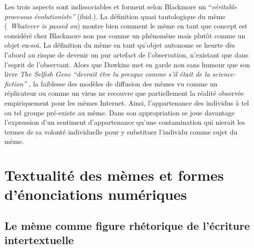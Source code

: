 Les trois aspects sont indissociables et forment selon Blackmore un {\textquotedblleft}\textit{v\'eritable processus \'evolutioniste{\textquotedblright} }(ibid.). La d\'efinition quasi tautologique du m\`eme ({\guillemotleft}~\textit{Whatever is passed on{\guillemotright}}) montre bien comment le m\`eme en tant que concept est consid\'er\'e chez Blackmore non pas comme un ph\'enom\`ene mais plut\^ot comme un objet en-soi. La d\'efinition du m\`eme en tant qu{\textquoteright}objet autonome se heurte d\`es l{\textquoteright}abord au risque de devenir un pur artefact de l{\textquoteright}observation, n{\textquoteright}existant que dans l{\textquoteright}esprit de l{\textquoteright}observant. Alors que Dawkins met en garde non sans humour que son livre \textit{The Selfish Gene} \textit{{\textquotedblleft}devrait \^etre lu presque comme s{\textquoteright}il \'etait de la science-fiction{\textquotedblright} }\cite{Dawkins1984}, la faiblesse des mod\`eles de diffusion des m\`emes vu comme un r\'eplicateur ou comme un virus ne recouvre que partiellement la r\'ealit\'e observ\'ee empiriquement pour les m\`emes Internet. Ainsi, l{\textquoteright}appartenance des individus \`a tel ou tel groupe pr\'e-existe au m\`eme. Dans son appropriation se joue davantage l{\textquoteright}expression d{\textquoteright}un sentiment d{\textquoteright}appartenance qu{\textquoteright}une contamination qui nierait les termes de sa volont\'e individuelle pour y substituer l{\textquoteright}individu comme sujet du m\`eme.  


\section[Textualit\'e des m\`emes et formes d{\textquoteright}\'enonciations num\'eriques]{Textualit\'e des m\`emes et formes d{\textquoteright}\'enonciations num\'eriques}

\subsection[Le m\`eme comme figure rh\'etorique de l{\textquoteright}\'ecriture intertextuelle]{Le m\`eme comme figure rh\'etorique de l{\textquoteright}\'ecriture intertextuelle}

